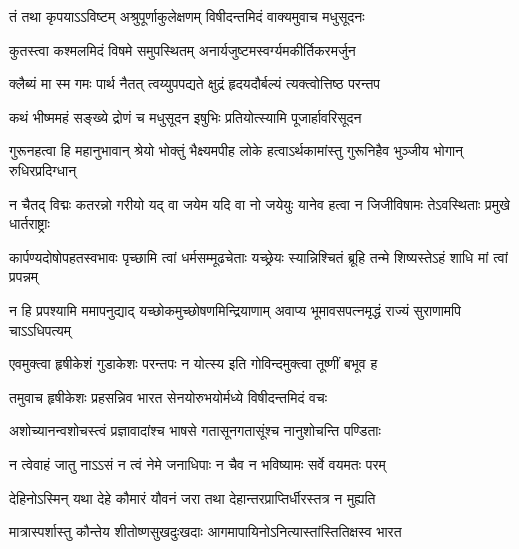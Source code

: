

\twolineshloka
{तं तथा कृपयाऽऽविष्टम् अश्रुपूर्णाकुलेक्षणम्}
{विषीदन्तमिदं वाक्यमुवाच मधुसूदनः}%


\twolineshloka
{कुतस्त्वा कश्मलमिदं विषमे समुपस्थितम्}
{अनार्यजुष्टमस्वर्ग्यमकीर्तिकरमर्जुन}%

\twolineshloka
{क्लैब्यं मा स्म गमः पार्थ नैतत् त्वय्युपपद्यते}
{क्षुद्रं हृदयदौर्बल्यं त्यक्त्वोत्तिष्ठ परन्तप}%


\twolineshloka
{कथं भीष्ममहं सङ्ख्ये द्रोणं च मधुसूदन}
{इषुभिः प्रतियोत्स्यामि पूजार्हावरिसूदन}%

\fourlineindentedshloka
{गुरूनहत्वा हि महानुभावान्}
{श्रेयो भोक्तुं भैक्ष्यमपीह लोके}
{हत्वाऽर्थकामांस्तु गुरूनिहैव}
{भुञ्जीय भोगान् रुधिरप्रदिग्धान्}%

\fourlineindentedshloka
{न चैतद् विद्मः कतरन्नो गरीयो}
{यद् वा जयेम यदि वा नो जयेयुः}
{यानेव हत्वा न जिजीविषामः}
{तेऽवस्थिताः प्रमुखे धार्तराष्ट्राः}%

\fourlineindentedshloka
{कार्पण्यदोषोपहतस्वभावः}
{पृच्छामि त्वां धर्मसम्मूढचेताः}
{यच्छ्रेयः स्यान्निश्चितं ब्रूहि तन्मे}
{शिष्यस्तेऽहं शाधि मां त्वां प्रपन्नम्}%

\fourlineindentedshloka
{न हि प्रपश्यामि ममापनुद्याद्}
{यच्छोकमुच्छोषणमिन्द्रियाणाम्}
{अवाप्य भूमावसपत्नमृद्धं}
{राज्यं सुराणामपि चाऽऽधिपत्यम्}%


\twolineshloka
{एवमुक्त्वा हृषीकेशं गुडाकेशः परन्तपः}
{न योत्स्य इति गोविन्दमुक्त्वा तूष्णीं बभूव ह}%

\twolineshloka
{तमुवाच हृषीकेशः प्रहसन्निव भारत}
{सेनयोरुभयोर्मध्ये विषीदन्तमिदं वचः}%


\twolineshloka
{अशोच्यानन्वशोचस्त्वं प्रज्ञावादांश्च भाषसे}
{गतासूनगतासूंश्च नानुशोचन्ति पण्डिताः}%

\twolineshloka
{न त्वेवाहं जातु नाऽऽसं न त्वं नेमे जनाधिपाः}
{न चैव न भविष्यामः सर्वे वयमतः परम्}%

\twolineshloka
{देहिनोऽस्मिन् यथा देहे कौमारं यौवनं जरा}
{तथा देहान्तरप्राप्तिर्धीरस्तत्र न मुह्यति}%

\twolineshloka
{मात्रास्पर्शास्तु कौन्तेय शीतोष्णसुखदुःखदाः}
{आगमापायिनोऽनित्यास्तांस्तितिक्षस्व भारत}%

